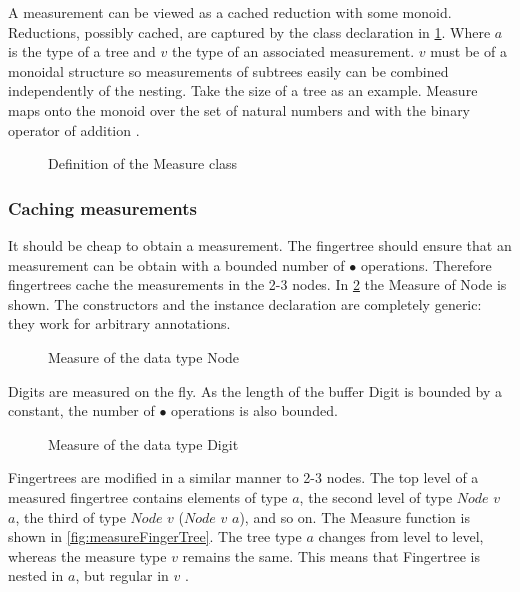 A measurement can be viewed as a cached reduction with some monoid. 
Reductions, possibly cached, are captured by the class declaration in 
\cref{fig:measure}. Where $a$ is the type of a tree and $v$ the type of an
associated measurement. $v$ must be of a monoidal structure so measurements of
subtrees easily can be combined independently of the nesting. Take the size of a
tree as an example. Measure maps onto the monoid over the set of natural numbers
and with the binary operator of addition \cite{fingertree}.

\begin{figure}[h!]

\caption{Definition of the Measure class \label{fig:measure}}
\end{figure}

\subsubsection{Caching measurements}
It should be cheap to obtain a measurement. The fingertree should ensure that an
measurement can be obtain with a bounded number of $\bullet$ operations.
Therefore fingertrees cache the measurements in the 2-3 nodes. In
\cref{fig:measureNode} the Measure of Node is shown.
The constructors and the instance declaration are completely generic: they
work for arbitrary annotations.

\begin{figure}[h!]

\caption{Measure of the data type Node \label{fig:measureNode}}
\end{figure}

Digits are measured on the fly. As the length of the buffer Digit is bounded by
a constant, the number of $\bullet$ operations is also bounded.

\begin{figure}[h!]

\caption{Measure of the data type Digit \label{fig:measureDigit}}
\end{figure}

Fingertrees are modified in a similar manner to 2-3 nodes.
The top level of a measured fingertree contains elements of type $a$, the second
level of type $Node$ $v$ $a$, the third of type $Node$ $v$ ($Node$ $v$ $a$), and
so on. The Measure function is shown in \cref{fig:measureFingerTree}. The tree 
type $a$ changes from level to level, whereas the measure type $v$ remains the 
same. This means that Fingertree is nested in $a$, but regular in $v$ \cite{fingertree}.

